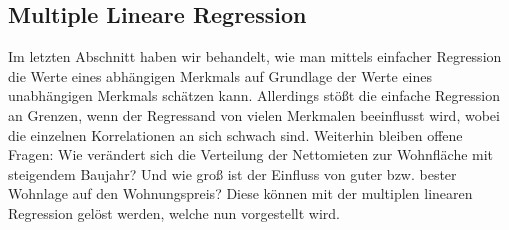 \subsection{Multiple Lineare Regression}
\label{sec:mult_reg}


Im letzten Abschnitt haben wir behandelt, wie man mittels einfacher Regression die Werte eines abhängigen Merkmals auf Grundlage der Werte eines unabhängigen Merkmals schätzen kann.
Allerdings stößt die einfache Regression an Grenzen, wenn der Regressand von vielen Merkmalen beeinflusst wird, wobei die einzelnen Korrelationen an sich schwach sind.
Weiterhin bleiben offene Fragen: 
Wie verändert sich die Verteilung der Nettomieten zur Wohnfläche mit steigendem Baujahr?
Und wie groß ist der Einfluss von guter bzw. bester Wohnlage auf den Wohnungspreis? 
Diese können mit der multiplen linearen Regression gelöst werden, welche nun vorgestellt wird.

